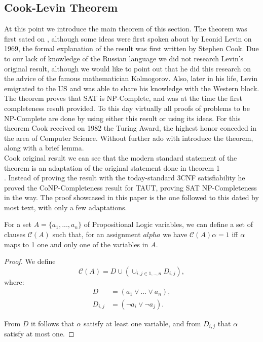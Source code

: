 \subsection{Cook-Levin Theorem}
At this point we introduce the main theorem of this section. The theorem was first sated on \cite{cook1971complexity}, although some ideas were first spoken about by Leonid Levin on 1969, the formal explanation of the result was first written by Stephen Cook. Due to our lack of knowledge of the Russian language we did not research Levin's original result, although we would like to point out that he did this research on the advice of the famous mathematician Kolmogorov. Also, later in his life, Levin emigrated to the US and was able to share his knowledge with the Western block\cite{cvlevincook}.\\




The theorem proves that SAT is NP-Complete, and was at the time the first completeness result provided. To this day virtually all proofs of problems to be NP-Complete are done by using either this result or using its ideas. For this theorem Cook received on 1982 the Turing Award, the highest honor conceded in the area of Computer Science. Without further ado with introduce the theorem, along with a brief lemma.\\

 Cook original result we can see that the modern standard statement of the theorem is an adaptation of the original statement done in theorem 1\\ \cite{cook1971complexity}. Instead of proving the result with the today-standard 3CNF satisfiability he proved the CoNP-Completeness result for TAUT, proving SAT NP-Completeness in the way. The proof showcased in this paper is the one followed to this dated by most text, with only a few adaptations. 

\begin{lemma}\label{lemma:cooklevin}
  For a set $A = \{a_1,...,a_n\}$ of Propositional Logic variables, we can define a set of clauses $\mathcal{C}(A)$ such that, for an assignment $alpha$ we have   $\mathcal{C}(A)\alpha = 1$ iff $\alpha$ maps to 1 one and only one of the variables in $A$.
\end{lemma}
\begin{proof}
  We define $$\mathcal{C}(A) = D\cup \left (  \cup_{i,j \in 1,..,n} D_{i,j} \right ),$$ where:
  \begin{equation}
    \begin{split}
      D & = (a_1 \vee ... \vee a_n ),\\
      D_{i,j} & = (\neg a_{i} \vee \neg a_{j} ).
\end{split}
\end{equation}

From $D$ it follows that $\alpha$ satisfy at least one variable, and from $D_{i,j}$ that $\alpha$ satisfy at most one.
\end{proof}


